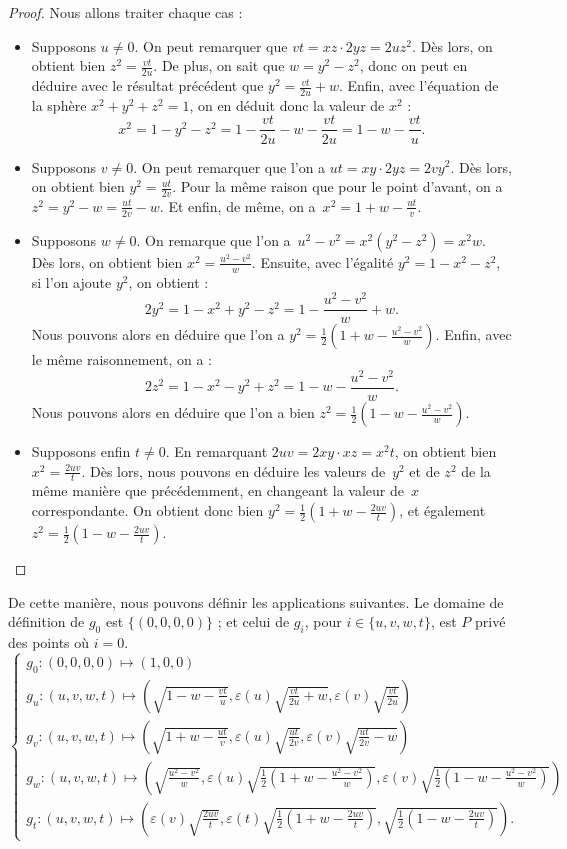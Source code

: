 \documentclass[hidelinks, 10pt]{article}
\begin{document}
\begin{proof}
Nous allons traiter chaque cas :
\begin{itemize}
    \item Supposons $u\neq0$.  On peut remarquer que $vt=xz\cdot 2yz=2uz^2$. Dès lors, on obtient bien $z^2=\frac{vt}{2u}$. De plus, on sait que $w=y^2-z^2$, donc on peut en déduire avec le résultat précédent que $y^2=\frac{vt}{2u}+w$. Enfin, avec l'équation de la sphère $x^2+y^2+z^2=1$, on en déduit donc la valeur de $x^2$ : \[x^2=1-y^2-z^2=1-\frac{vt}{2u}-w-\frac{vt}{2u}=1-w-\frac{vt}{u}.\]
    \item Supposons $v\neq0$. On peut remarquer que l'on a $ut=xy\cdot 2yz=2vy^2$. Dès lors, on obtient bien $y^2=\frac{ut}{2v}$. Pour la même raison que pour le point d'avant, on a~$z^2=y^2-w=\frac{ut}{2v}-w$. Et enfin, de même, on a~$x^2=1+w-\frac{ut}{v}$.
    \item Supposons $w\neq 0$. On remarque que l'on a~$u^2-v^2=x^2(y^2-z^2)=x^2w$. Dès lors, on obtient bien $x^2=\frac{u^2-v^2}{w}$. Ensuite, avec l'égalité $y^2=1-x^2-z^2$, si l'on ajoute $y^2$, on obtient : \[2y^2=1-x^2+y^2-z^2=1-\frac{u^2-v^2}{w}+w.\]Nous pouvons alors en déduire que l'on a $y^2=\frac{1}{2}\left(1+w-\frac{u^2-v^2}{w}\right)$. Enfin, avec le même raisonnement, on a : \[2z^2=1-x^2-y^2+z^2=1-w-\frac{u^2-v^2}{w}.\]Nous pouvons alors en déduire que l'on a bien $z^2=\frac{1}{2}\left(1-w-\frac{u^2-v^2}{w}\right)$.
    \item Supposons enfin $t\neq 0$. En remarquant $2uv=2xy\cdot xz=x^2t$, on obtient bien $x^2=\frac{2uv}{t}$. Dès lors, nous pouvons en déduire les valeurs de~$y^2$ et de $z^2$ de la même manière que précédemment, en changeant la valeur de~$x$ correspondante. On obtient donc bien $y^2=\frac{1}{2}\left(1+w-\frac{2uv}{t}\right)$, et également~$z^2=\frac{1}{2}\left(1-w-\frac{2uv}{t}\right)$.
\end{itemize}
\end{proof}

De cette manière, nous pouvons définir les applications suivantes. Le domaine de définition de $g_0$ est $\{(0,0,0,0)\}$ ; et celui de $g_i$, pour $i\in\{u,v,w,t\}$, est $P$ privé des points où $i=0$.
\[\left\{\begin{matrix}
g_0:(0,0,0,0)\mapsto(1,0,0)\\
g_u:(u,v,w,t)\mapsto\left(\sqrt{1-w-\frac{vt}{u}} ,\varepsilon(u)\sqrt{\frac{vt}{2u}+w},\varepsilon(v)\sqrt{\frac{vt}{2u}} \right)\\ 
g_v:(u,v,w,t)\mapsto\left(\sqrt{1+w-\frac{ut}{v}} ,\varepsilon(u)\sqrt{\frac{ut}{2v}},\varepsilon(v)\sqrt{\frac{ut}{2v}-w} \right)\\ 
g_w:(u,v,w,t)\mapsto\left(\sqrt{\frac{u^2-v^2}{w}},\varepsilon(u)\sqrt{\frac{1}{2}\left(1+w-\frac{u^2-v^2}{w}\right)},\varepsilon(v)\sqrt{\frac{1}{2}\left(1-w-\frac{u^2-v^2}{w}\right)}\right)\\ 
g_t:(u,v,w,t)\mapsto\left( \varepsilon(v)\sqrt{\frac{2uv}{t}},\varepsilon(t)\sqrt{\frac{1}{2}\left(1+w-\frac{2uv}{t}\right)},\sqrt{\frac{1}{2}\left(1-w-\frac{2uv}{t}\right)} \right).
\end{matrix}\right.\]
\end{document}
